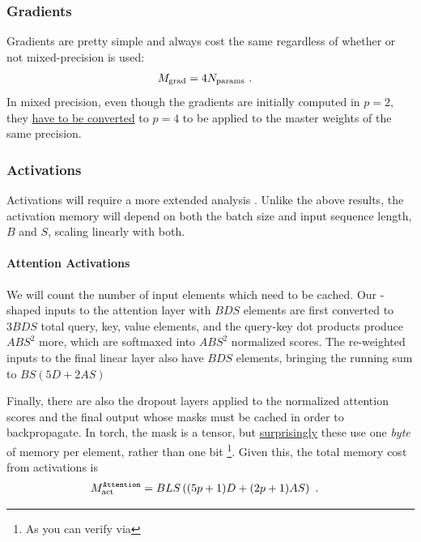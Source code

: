 \documentclass[11pt]{article}
\begin{document}
\subsubsection{Gradients}

Gradients are pretty simple and always cost the same regardless of whether or not mixed-precision is
used:
\begin{align}
	M_{ \rm grad} & = 4 N _{ \rm params }     \label{eq_grad_memory} \ .
\end{align}
In mixed precision, even though the gradients are initially computed in $ p= 2$, they
\href{https://huggingface.co/docs/transformers/v4.20.1/en/perf_train_gpu_one#anatomy-of-models-memory}{have to
	be converted} to $ p=4 $ to be applied to the master weights of the same precision.




\subsubsection{Activations}

Activations will require a more extended analysis \cite{korthikanti2022reducing}. Unlike the above
results, the activation memory will depend on both the batch size and input sequence length, $ B $
and $ S $, scaling linearly with both.



\paragraph{Attention Activations}

We will count the number of input elements which need to be cached. Our -shaped inputs
to the attention layer with $ BDS $ elements are first converted to $ 3BDS $ total query, key, value
elements, and the query-key dot products produce $ ABS ^{ 2 } $ more, which are softmaxed into $ ABS
		^{ 2 } $ normalized scores. The re-weighted inputs to the final linear layer also have $ BDS $
elements, bringing the running sum to $ BS \left ( 5D + 2AS  \right ) $

Finally, there are also the dropout layers applied to the normalized attention scores and the final
output whose masks must be cached in order to
backpropagate. In torch, the mask is a  tensor, but
\href{https://github.com/pytorch/pytorch/issues/41571}{surprisingly} these use one \textit{byte} of
memory per element, rather than one bit \footnote{As you can verify
	via }.
Given this, the total memory cost from activations is
\begin{align}
	M _{ \rm act  } ^\texttt{Attention} & = BLS \left ( (5p+1)D + (2p+1)AS  \right ) \ .
	\label{eq_att_actmem_vanilla}
\end{align}
\end{document}
